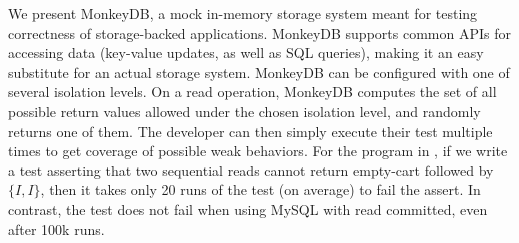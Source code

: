 
We present MonkeyDB, a mock in-memory storage system meant for testing
correctness of storage-backed applications. 
MonkeyDB supports 
common APIs for accessing data (key-value updates, as well as SQL queries),
making it an easy substitute for an actual storage system. MonkeyDB
can be configured with one of several isolation levels. 
On a read operation, MonkeyDB computes the set of all possible return values
allowed under the chosen isolation level, and randomly returns one of them. The
developer can then simply execute their test multiple times to get coverage of
possible weak behaviors. For the program in , if we write a test
asserting that two sequential reads cannot return empty-cart followed by $\{I,
I\}$, then it takes only 20 runs of the test (on average) to fail the
assert. In contrast, the test does not fail when using MySQL with read committed, 
even after 100k runs. 

